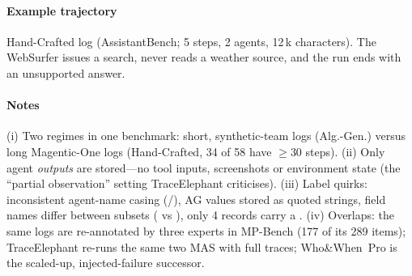 \paragraph{Example trajectory} Hand-Crafted log  (AssistantBench; 5 steps, 2 agents, 12\,k characters). The WebSurfer issues a search, never reads a weather source, and the run ends with an unsupported answer.


\paragraph{Notes} (i) Two regimes in one benchmark: short, synthetic-team logs (Alg.-Gen.) versus long Magentic-One logs (Hand-Crafted, 34 of 58 have $\ge$30 steps). (ii) Only agent \emph{outputs} are stored---no tool inputs, screenshots or environment state (the ``partial observation'' setting TraceElephant criticises). (iii) Label quirks: inconsistent agent-name casing (/), AG values stored as quoted strings, field names differ between subsets ( vs ), only 4 records carry a . (iv) Overlaps: the same logs are re-annotated by three experts in MP-Bench (177 of its 289 items); TraceElephant re-runs the same two MAS with full traces; Who\&When~Pro is the scaled-up, injected-failure successor.
